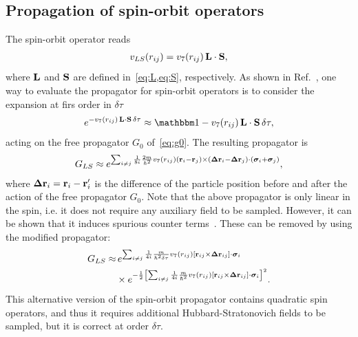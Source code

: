 \documentclass[aps,prc,twocolumn,superscriptaddress,showpacs,floatfix,nofootinbib]{revtex4-1}
\begin{document}
\subsection{Propagation of spin-orbit operators}
\label{sec:pls}
The spin-orbit operator reads
\begin{align}
v_{LS}(r_{ij})=v_7(r_{ij})\,\vb{L}\cdot\vb{S} ,
\end{align}
where $\vb{L}$ and $\vb{S}$ are defined in~\cref{eq:L,eq:S}, respectively.
As shown in Ref.~\cite{Pieper:1998}, one way to evaluate
the propagator for spin-orbit operators is to consider the expansion at firs order in $\delta\tau$
\begin{align}
	e^{-v_7(r_{ij})\,\vb{L}\cdot\vb{S}\,\delta\tau}\approx\mathbbm1-v_7(r_{ij})\,\vb{L}\cdot\vb{S}\,\delta\tau ,
\end{align}
acting on the free propagator $G_0$ of~\cref{eq:g0}.
The resulting propagator is
\begin{align}
G_{LS}\approx e^{\sum_{i\ne j}\frac{1}{8i}\frac{2m}{\hbar^2}v_7(r_{ij})(\vb{r}_i-\vb{r}_j)
\times(\bm\Delta\vb{r}_i-\bm\Delta\vb{r}_j)\cdot(\bm\sigma_i+\bm\sigma_j)} ,
\end{align}
where $\bm\Delta\vb{r}_i=\vb{r}_i-\vb{r}_i'$ is the difference of the particle position before and after the
action of the free propagator $G_0$.
Note that the above propagator is only linear in the spin, i.e. it does not require any
auxiliary field to be sampled.
However, it can be shown that it induces spurious counter terms~\cite{Sarsa:2003}.
These can be removed by using the modified propagator:
\begin{align}
G_{LS}\approx &\,e^{\sum_{i\neq j}\frac{1}{4i}\frac{m}{\hbar^2\delta\tau}v_7(r_{ij})
[\vb{r}_{ij}\times\bm\Delta\vb{r}_{ij}]\cdot\bm\sigma_i}
\nonumber \\
&\times e^{-\frac{1}{2}\left[\sum_{i\neq j}\frac{1}{4i}\frac{m}{\hbar^2}v_7(r_{ij})
[\vb{r}_{ij}\times\bm\Delta\vb{r}_{ij}]\cdot\bm\sigma_i\right]^2} .
\end{align}
This alternative version of the spin-orbit propagator contains quadratic spin operators,
and thus it requires additional Hubbard-Stratonovich fields to be sampled, but it is 
correct at order $\delta\tau$.
\end{document}
